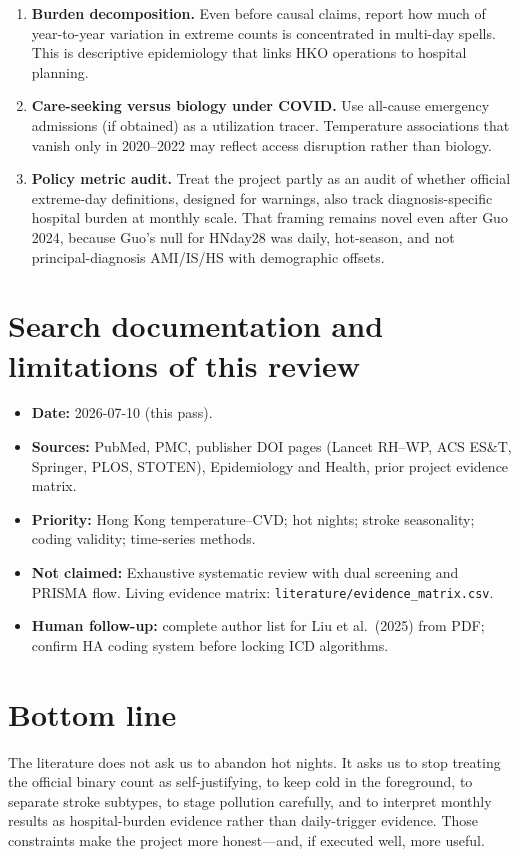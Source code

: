 \documentclass[11pt]{article}
\begin{document}
\begin{enumerate}
  \item \textbf{Burden decomposition.} Even before causal claims, report how much of
        year-to-year variation in extreme counts is concentrated in multi-day
        spells. This is descriptive epidemiology that links HKO operations to
        hospital planning.
  \item \textbf{Care-seeking versus biology under COVID.} Use all-cause emergency
        admissions (if obtained) as a utilization tracer. Temperature associations
        that vanish only in 2020--2022 may reflect access disruption rather than
        biology.
  \item \textbf{Policy metric audit.} Treat the project partly as an audit of
        whether official extreme-day definitions, designed for warnings, also track
        diagnosis-specific hospital burden at monthly scale. That framing remains
        novel even after Guo 2024, because Guo's null for HNday28 was daily,
        hot-season, and not principal-diagnosis AMI/IS/HS with demographic offsets.
\end{enumerate}

\section{Search documentation and limitations of this review}

\begin{itemize}
  \item \textbf{Date:} 2026-07-10 (this pass).
  \item \textbf{Sources:} PubMed, PMC, publisher DOI pages (Lancet RH--WP, ACS ES\&T,
        Springer, PLOS, STOTEN), Epidemiology and Health, prior project evidence
        matrix.
  \item \textbf{Priority:} Hong Kong temperature--CVD; hot nights; stroke
        seasonality; coding validity; time-series methods.
  \item \textbf{Not claimed:} Exhaustive systematic review with dual screening and
        PRISMA flow. Living evidence matrix:
        \texttt{literature/evidence\_matrix.csv}.
  \item \textbf{Human follow-up:} complete author list for Liu et al.\ (2025) from
        PDF; confirm HA coding system before locking ICD algorithms.
\end{itemize}

\section*{Bottom line}

The literature does not ask us to abandon hot nights. It asks us to stop treating
the official binary count as self-justifying, to keep cold in the foreground, to
separate stroke subtypes, to stage pollution carefully, and to interpret monthly
results as hospital-burden evidence rather than daily-trigger evidence. Those
constraints make the project more honest---and, if executed well, more useful.



\end{document}
